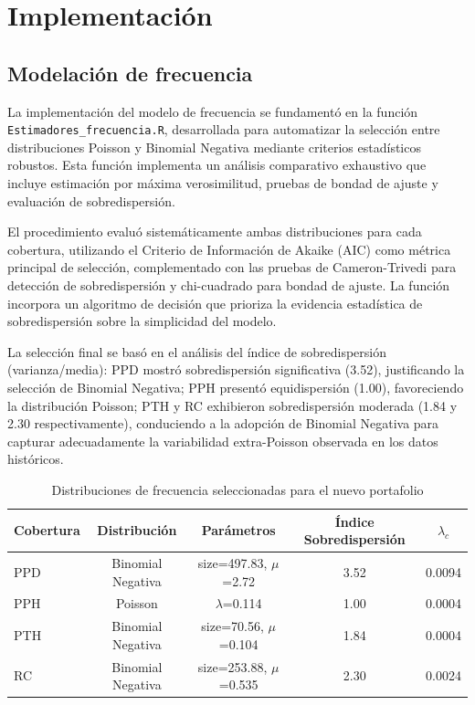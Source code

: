 \section{Implementación}

\subsection{Modelación de frecuencia}

La implementación del modelo de frecuencia se fundamentó en la función \texttt{Estimadores\_frecuencia.R}, desarrollada para automatizar la selección entre distribuciones Poisson y Binomial Negativa mediante criterios estadísticos robustos. Esta función implementa un análisis comparativo exhaustivo que incluye estimación por máxima verosimilitud, pruebas de bondad de ajuste y evaluación de sobredispersión.

El procedimiento evaluó sistemáticamente ambas distribuciones para cada cobertura, utilizando el Criterio de Información de Akaike (AIC) como métrica principal de selección, complementado con las pruebas de Cameron-Trivedi para detección de sobredispersión y chi-cuadrado para bondad de ajuste. La función incorpora un algoritmo de decisión que prioriza la evidencia estadística de sobredispersión sobre la simplicidad del modelo.

La selección final se basó en el análisis del índice de sobredispersión (varianza/media): PPD mostró sobredispersión significativa (3.52), justificando la selección de Binomial Negativa; PPH presentó equidispersión (1.00), favoreciendo la distribución Poisson; PTH y RC exhibieron sobredispersión moderada (1.84 y 2.30 respectivamente), conduciendo a la adopción de Binomial Negativa para capturar adecuadamente la variabilidad extra-Poisson observada en los datos históricos.

\begin{table}[H]
\centering
\caption{Distribuciones de frecuencia seleccionadas para el nuevo portafolio}
\begin{tabular}{lcccc}
\hline
\textbf{Cobertura} & \textbf{Distribución} & \textbf{Parámetros} & \textbf{Índice Sobredispersión} & \textbf{$\lambda_c$} \\
\hline
PPD & Binomial Negativa & size=497.83, $\mu$=2.72 & 3.52 & 0.0094 \\
PPH & Poisson & $\lambda$=0.114 & 1.00 & 0.0004 \\
PTH & Binomial Negativa & size=70.56, $\mu$=0.104 & 1.84 & 0.0004 \\
RC & Binomial Negativa & size=253.88, $\mu$=0.535 & 2.30 & 0.0024 \\
\hline
\end{tabular}
\end{table}

